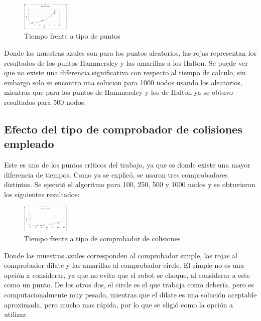 \begin{figure}[H]
		\centering
        \includegraphics[width=0.2\textwidth]{images/t_vs_nodos_vs_tipo.png}
        \caption{Tiempo frente a tipo de puntos}
        \label{fig:t_vs_tipo}
\end{figure}

Donde las muestras azules son para los puntos aleatorios, las rojas representan los resultados de los puntos Hammersley y las amarillas a los Halton. Se puede ver que no existe una diferencia significativa con respecto al tiempo de calculo, sin embargo solo se encontro una solucion para 1000 nodos usando los aleatorios, mientras que para los puntos de Hammersley y los de Halton ya se obtuvo resultados para 500 nodos.

\subsection{Efecto del tipo de comprobador de colisiones empleado}

Este es uno de los puntos criticos del trabajo, ya que es donde existe una mayor diferencia de tiempos. Como ya se explicó, se usaron tres comprobadores distintos. Se ejecutó el algoritmo para 100, 250, 500 y 1000 nodos y se obtuvieron los siguientes resultados:\\ 

\begin{figure}[H]
		\centering
        \includegraphics[width=0.2\textwidth]{images/t_vs_nodos_vs_col.png}
        \caption{Tiempo frente a tipo de comprobador de colisiones}
        \label{fig:t_vs_col}
\end{figure}

Donde las muestras azules corresponden al comprobador simple, las rojas al comprobador dilate y las amarillas al comprobador circle. El simple no es una opción a considerar, ya que no evita que el robot se choque, al considerar a este como un punto. De los otros dos, el circle es el que trabaja como debería, pero es computacionalmente muy pesado, mientras que el dilate es una solución aceptable aproximada, pero mucho mas rápida, por lo que se eligió como la opción a utilizar.